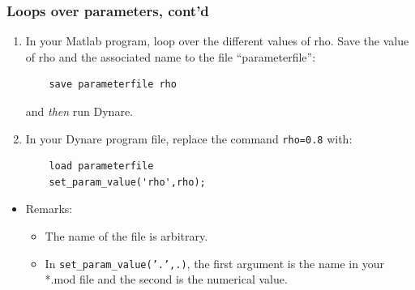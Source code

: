 \documentclass{beamer}
\begin{document}
\begin{frame}[fragile]
\frametitle{Loops over parameters, cont'd}
\begin{enumerate}
	\item In your Matlab program, loop over the different values of rho.
	Save the value of rho and the associated name to the file ``parameterfile'':
	\begin{verbatim}
	save parameterfile rho
	\end{verbatim}
	and \textit{then} run Dynare.
	\item In your Dynare program file, replace the command \texttt{rho=0.8} with:
	\begin{verbatim}
	load parameterfile
	set_param_value('rho',rho);
	\end{verbatim}
	
\end{enumerate}

\begin{itemize}
	\item Remarks:
	\begin{itemize}
		\item The name of the file is arbitrary.
		\item In \texttt{set\_param\_value('.',.)}, the first argument is the name in your *.mod file and the second is the numerical value.
	\end{itemize}
\end{itemize}

\end{frame}
\end{document}
